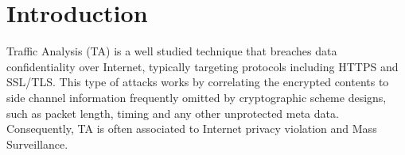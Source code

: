 \section{Introduction}
Traffic Analysis (TA) is a well studied technique that breaches data confidentiality over Internet, typically targeting protocols including HTTPS\cite{rfc2818} and SSL\cite{rfc6101}/TLS\cite{rfc5246}. This type of attacks works by correlating the encrypted contents to side channel information frequently omitted by cryptographic scheme designs, such as packet length, timing and any other unprotected meta data. Consequently, TA is often associated to Internet privacy violation and Mass Surveillance.
